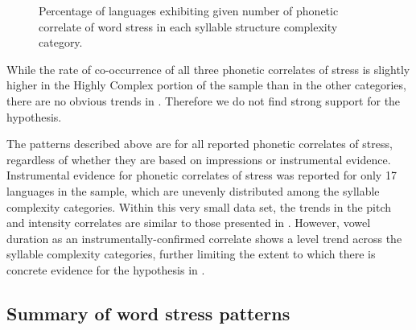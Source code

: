 \begin{figure}
\caption{\label{fig:5.5} Percentage of languages exhibiting given number of phonetic correlate of word stress in each syllable structure complexity category.}
\end{figure}

  While the rate of co-occurrence of all three phonetic correlates of stress is slightly higher in the Highly Complex portion of the sample than in the other categories, there are no obvious trends in . Therefore we do not find strong support for the hypothesis.

  The patterns described above are for all reported phonetic correlates of stress, regardless of whether they are based on impressions or instrumental evidence. Instrumental evidence for phonetic correlates of stress was reported for only 17 languages in the sample, which are unevenly distributed among the syllable complexity categories. Within this very small data set, the trends in the pitch and intensity correlates are similar to those presented in . However, vowel duration as an instrumentally-confirmed correlate shows a level trend across the syllable complexity categories, further limiting the extent to which there is concrete evidence for the hypothesis in .

\subsection{Summary of word stress patterns}\label{sec:5.4.6}

